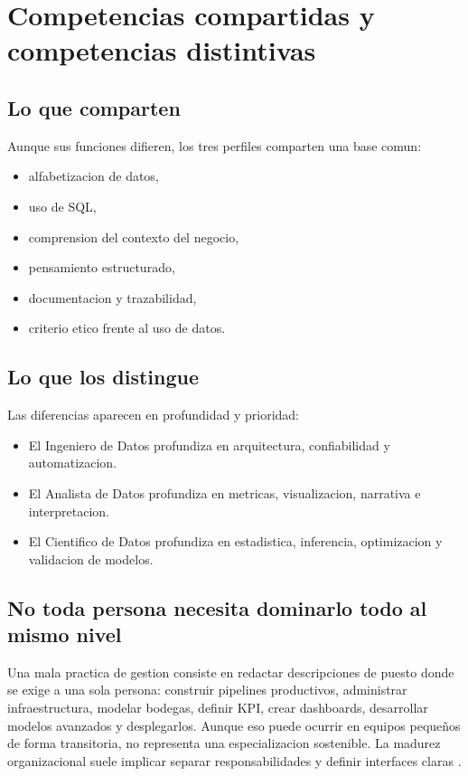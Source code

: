 \documentclass[12pt]{article}
\begin{document}
\section{Competencias compartidas y competencias distintivas}
\subsection{Lo que comparten}
Aunque sus funciones difieren, los tres perfiles comparten una base comun:
\begin{itemize}[leftmargin=*]
\item alfabetizacion de datos,
\item uso de SQL,
\item comprension del contexto del negocio,
\item pensamiento estructurado,
\item documentacion y trazabilidad,
\item criterio etico frente al uso de datos.
\end{itemize}

\subsection{Lo que los distingue}
Las diferencias aparecen en profundidad y prioridad:
\begin{itemize}[leftmargin=*]
\item El Ingeniero de Datos profundiza en arquitectura, confiabilidad y automatizacion.
\item El Analista de Datos profundiza en metricas, visualizacion, narrativa e interpretacion.
\item El Cientifico de Datos profundiza en estadistica, inferencia, optimizacion y validacion de modelos.
\end{itemize}

\subsection{No toda persona necesita dominarlo todo al mismo nivel}
Una mala practica de gestion consiste en redactar descripciones de puesto donde se exige a una sola persona: construir pipelines productivos, administrar infraestructura, modelar bodegas, definir KPI, crear dashboards, desarrollar modelos avanzados y desplegarlos. Aunque eso puede ocurrir en equipos pequeños de forma transitoria, no representa una especializacion sostenible. La madurez organizacional suele implicar separar responsabilidades y definir interfaces claras \cite{ibm_modern_team,ibm_roles}.
\end{document}
